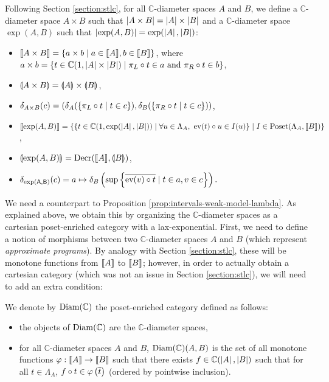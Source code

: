 Following Section \ref{section:stlc}, for all $\mathbb{C}$-diameter spaces $A$ and $B$, we define a $\mathbb{C}$-diameter space $A \times B$ such that $\left\vert A \times B\right\vert = \left\vert A\right\vert \times \left\vert B\right\vert$ and a $\mathbb{C}$-diameter space $\exp(A,B)$ such that $\left\vert\exp(A,B)\right\vert = \exp(\left\vert A\right\vert,\left\vert B\right\vert)$: \begin{itemize}
\item $\llbracket A \times B \rrbracket = \{ a \times b \mid a \in \llbracket A \rrbracket, b \in \llbracket B \rrbracket \} $, where $a \times b = \{ t \in \mathbb{C}(1, \left\vert A\right\vert \times \left\vert B\right\vert) \mid \pi_L \circ t \in a \text{ and } \pi_R \circ t \in b \}$,
\item $\llparenthesis A \times B \rrparenthesis = \llparenthesis A \rrparenthesis \times \llparenthesis B \rrparenthesis$,
\item $\delta_{A \times B}(c) = (\delta_A(\{ \pi_L \circ t \mid t \in c \}), \delta_B(\{ \pi_R \circ t \mid t \in c \}))$,
\item $\llbracket \exp(A, B) \rrbracket = \{ \{ t \in \mathbb{C}(1, \exp(\left\vert A\right\vert, \left\vert B\right\vert)) \mid \forall u \in \Lambda_{A},~ \operatorname{ev}(t) \circ u \in I(u) \} \mid I\in \operatorname{Poset}(\Lambda_A, \llbracket B \rrbracket) \}$,
\item $\llparenthesis \exp(A, B) \rrparenthesis = \operatorname{Decr}(\llbracket A \rrbracket, \llparenthesis B \rrparenthesis)$,
\item $\delta_\mathsf{\exp(A, B)}(c) = a \mapsto \delta_B\left(\sup\left\{\overline{\operatorname{ev}(v) \circ t} \mid t\in a, v \in c\right\}\right).$
\end{itemize}

We need a counterpart to Proposition \ref{prop:intervals-weak-model-lambda}. As explained above, we obtain this by organizing the $\mathbb{C}$-diameter spaces as a cartesian poset-enriched category with a lax-exponential. First, we need to define a notion of morphisms between two $\mathbb{C}$-diameter spaces $A$ and $B$ (which represent \emph{approximate programs}). By analogy with Section \ref{section:stlc}, these will be monotone functions from $\llbracket A \rrbracket$ to $\llbracket B \rrbracket$; however, in order to actually obtain a cartesian category (which was not an issue in Section \ref{section:stlc}), we will need to add an extra condition:

\begin{definition}
We denote by $\operatorname{Diam}(\mathbb{C})$ the poset-enriched category defined as follows: \begin{itemize}
\item the objects of $\operatorname{Diam}(\mathbb{C})$ are the $\mathbb{C}$-diameter spaces,
\item for all $\mathbb{C}$-diameter spaces $A$ and $B$, $\operatorname{Diam}(\mathbb{C})(A,B)$ is the set of all monotone functions $\varphi : \llbracket A \rrbracket \to \llbracket B \rrbracket$ such that there exists $f \in \mathbb{C}(\left\vert A\right\vert,\left\vert B\right\vert)$ such that for all $t \in \Lambda_A$, $f \circ t \in \varphi\left(\overline{t}\right)$ (ordered by pointwise inclusion).
\end{itemize}
\end{definition}

